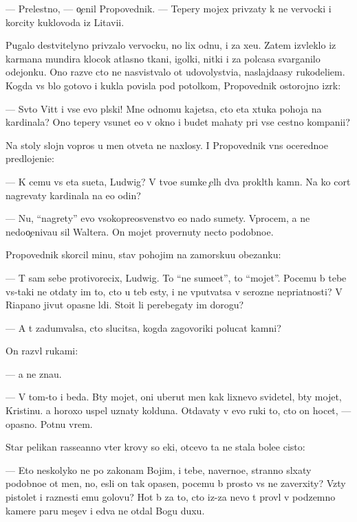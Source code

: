 \documentclass[10pt]{book}
\begin{document}
— Prelestno, — o{\c}enil Pro\-po\-ved\-nik. — Tepery mojex priv{\ia}zaty k ne{\y} ver{\e}vocki i korcity kuklovoda iz Litavi{\y}i.

Pugalo de{\y}stvitelyno priv{\ia}zalo ver{\e}vocku, no lix odnu, i za xe{\y}u. Zatem izvleklo iz karmana mundira klocok atlasno{\y} tkani, igolki, nitki i za polcasa svarganilo odejonku. Ono razve cto ne nasvist{\yi}valo ot udovolystvi{\y}a, naslajda{\y}asy rukodeli{\y}em. Kogda vs{\e} b{\yi}lo gotovo i kukla povisla pod potolkom, Pro\-po\-ved\-nik ostorojno izr{\e}k:

— Sv{\ia}to{\y} Vitt i vse {\y}evo pl{\ia}ski! Mne odnomu kajetsa, cto eta xtuka pohoja na kardinala? Ono tepery v{\yi}sunet {\y}e{\y}o v okno i budet mahaty pri vse{\y} cestno{\y} kompani{\y}i?

Na stoly slojn{\yi}{\y} vopros u men{\ia} otveta ne naxlosy. I Pro\-po\-ved\-nik vn{\e}s oceredno{\y}e predlojeni{\y}e:

— K cemu vs{\ia} eta su{\y}eta, Ludwig? V tvo{\y}e{\y} sumke {\c}el{\yi}h dva pro\-kl{\ia}\-t{\yi}h kamn{\ia}. Na ko{\y} cort nagrevaty kardinala na {\y}e{\x}o odin?

— Nu, ``nagrety'' {\y}evo v{\yi}sokopreosv{\ia}{\x}enstvo {\y}e{\x}o nado sumety. Vprocem, {\y}a ne nedoo{\c}eniva{\y}u sil{\yi} Waltera. On mojet provernuty necto po\-dob\-no\-{\y}e.

Pro\-po\-ved\-nik skorcil minu, stav pohojim na zamorsku{\y}u obez{\y}anku:

— T{\yi} sam sebe protivorecix, Ludwig. To ``ne sume{\y}et'', to ``mojet''. Po\-ce\-mu b{\yi} tebe vs{\e}-taki ne otdaty im to, cto u teb{\ia} {\y}esty, i ne vput{\yi}vatsa v ser{\y}ozn{\yi}{\y}e nepri\-{\y}at\-nosti? V Riapano jivut opasn{\yi}{\y}e l{\io}di. Sto{\y}it li perebegaty im do\-ro\-gu?

— A t{\yi} zadum{\yi}valsa, cto slucitsa, kogda zagovor{\x}iki polucat kamni?

On razv{\e}l rukami:

— {\Y}a ne zna{\y}u.

— V tom-to i beda. B{\yi}ty mojet, oni uberut men{\ia} kak lixnevo svidetel{\ia}, b{\yi}ty mojet, Kristinu. {\Y}a horoxo uspel uznaty kolduna. Otdavaty v {\y}evo ruki to, cto on hocet, — opasno. Pot{\ia}nu vrem{\ia}.

Star{\yi}{\y} pelikan rasse{\y}anno v{\yi}ter krovy so {\x}eki, otcevo ta ne stala bole{\y}e cisto{\y}:

— Eto neskolyko ne po zakonam Boj{\y}im, i tebe, naverno{\y}e, stranno sl{\yi}xaty po\-dob\-no\-{\y}e ot men{\ia}, no, {\y}esli on tak opasen, pocemu b{\yi} prosto vs{\e} ne zaverxity? Vz{\ia}ty pistolet i raznesti {\y}emu golovu? Hot{\ia} b{\yi} za to, cto iz-za nevo t{\yi} prov{\e}l v podzemno{\y} kamere paru mes{\ia}{\c}ev i {\y}edva ne otdal Bogu duxu.
\end{document}
